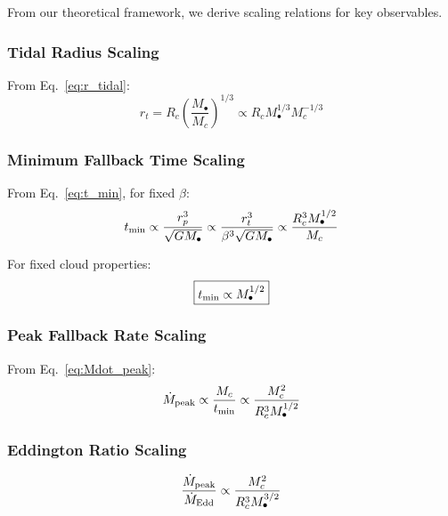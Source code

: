 \documentclass[twocolumn,amsmath,amssymb,prd,superscriptaddress,nofootinbib]{revtex4-2}
\begin{document}
From our theoretical framework, we derive scaling relations for key observables.

\subsubsection{Tidal Radius Scaling}

From Eq.~\eqref{eq:r_tidal}:
\begin{equation}
    r_t = R_c\left(\frac{M_\bullet}{M_c}\right)^{1/3} \propto R_c M_\bullet^{1/3} M_c^{-1/3}
    \label{eq:r_t_scaling}
\end{equation}

\subsubsection{Minimum Fallback Time Scaling}

From Eq.~\eqref{eq:t_min}, for fixed $\beta$:
\begin{equation}
    t_{\rm min} \propto \frac{r_p^3}{\sqrt{GM_\bullet}} \propto \frac{r_t^3}{\beta^3\sqrt{GM_\bullet}} \propto \frac{R_c^3 M_\bullet^{1/2}}{M_c}
    \label{eq:t_min_scaling}
\end{equation}

For fixed cloud properties:
\begin{equation}
    \boxed{t_{\rm min} \propto M_\bullet^{1/2}}
\end{equation}

\subsubsection{Peak Fallback Rate Scaling}

From Eq.~\eqref{eq:Mdot_peak}:
\begin{equation}
    \dot{M}_{\rm peak} \propto \frac{M_c}{t_{\rm min}} \propto \frac{M_c^2}{R_c^3 M_\bullet^{1/2}}
    \label{eq:Mdot_scaling}
\end{equation}

\subsubsection{Eddington Ratio Scaling}

\begin{equation}
    \frac{\dot{M}_{\rm peak}}{\dot{M}_{\rm Edd}} \propto \frac{M_c^2}{R_c^3 M_\bullet^{3/2}}
    \label{eq:Edd_ratio_scaling}
\end{equation}

\end{document}
